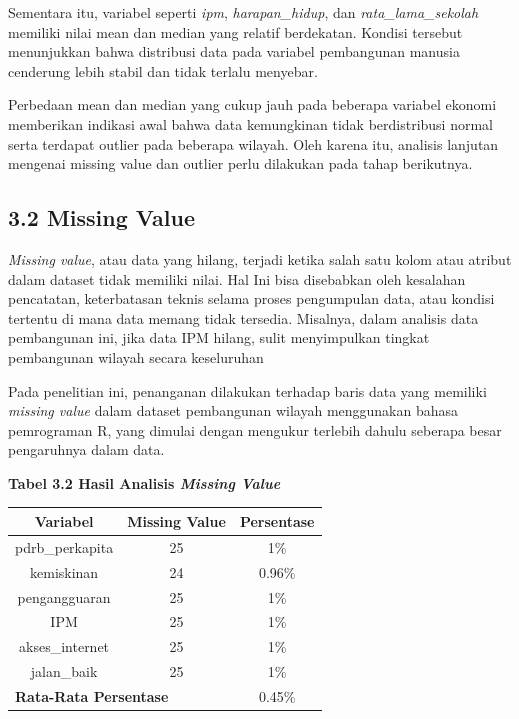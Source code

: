 \documentclass[
  12pt,
]{article}
\begin{document}
Sementara itu, variabel seperti \textit{ipm}, \textit{harapan\_hidup},
dan \textit{rata\_lama\_sekolah} memiliki nilai mean dan median yang
relatif berdekatan. Kondisi tersebut menunjukkan bahwa distribusi data
pada variabel pembangunan manusia cenderung lebih stabil dan tidak
terlalu menyebar.

Perbedaan mean dan median yang cukup jauh pada beberapa variabel ekonomi
memberikan indikasi awal bahwa data kemungkinan tidak berdistribusi
normal serta terdapat outlier pada beberapa wilayah. Oleh karena itu,
analisis lanjutan mengenai missing value dan outlier perlu dilakukan
pada tahap berikutnya.

\subsection{\texorpdfstring{\normalsize 3.2 \hspace {0,5cm} Missing
Value}{3.2  Missing Value}}\label{missing-value}

\textit{Missing value}, atau data yang hilang, terjadi ketika salah satu
kolom atau atribut dalam dataset tidak memiliki nilai. Hal Ini bisa
disebabkan oleh kesalahan pencatatan, keterbatasan teknis selama proses
pengumpulan data, atau kondisi tertentu di mana data memang tidak
tersedia. Misalnya, dalam analisis data pembangunan ini, jika data IPM
hilang, sulit menyimpulkan tingkat pembangunan wilayah secara
keseluruhan

Pada penelitian ini, penanganan dilakukan terhadap baris data yang
memiliki \textit{missing value} dalam dataset pembangunan wilayah
menggunakan bahasa pemrograman R, yang dimulai dengan mengukur terlebih
dahulu seberapa besar pengaruhnya dalam data.

\vspace{4cm}

\begin{center}
  \textbf{Tabel 3.2 Hasil Analisis \textit{Missing Value}}
  
  \begin{tabular}{|c|c|c|}
  \hline
  \textbf{Variabel} & \textbf{Missing Value} & \textbf{Persentase} \\
  \hline
  pdrb\_perkapita & 25 & 1\% \\
  \hline
  kemiskinan & 24 & 0.96\% \\
  \hline
  pengangguaran & 25 & 1\% \\
  \hline
  IPM & 25 & 1\% \\
  \hline
  akses\_internet & 25 & 1\% \\
  \hline
  jalan\_baik & 25 & 1\% \\
  \hline
  \multicolumn{2}{|l|}{\textbf{Rata-Rata Persentase}} & 0.45\% \\
  \hline
  \end{tabular}

\end{center}
\end{document}
